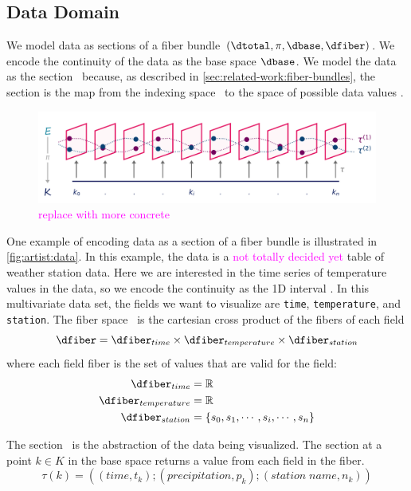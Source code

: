 \documentclass[10pt,journal,compsoc]{IEEEtran}
\newcommand{\note}[1]{\textcolor{magenta}{#1}}
\theoremstyle{definition}
\theoremstyle{remark}
\begin{document}
\subsection{Data Domain}
We model data as sections of a fiber bundle $(\dtotal, \pi, \dbase, \dfiber)$. We encode the continuity of the data as the \textcolor{base}{base space} $\dbase$. We model the data as the section \dsection\ because, as described in \autoref{sec:related-work:fiber-bundles}, the section is the map from the indexing space \dbase\ to the space of possible data values \dfiber. 

\begin{figure}[h!]
  \includegraphics[width=\columnwidth]{fiberbundle.png}
  \caption{\note{replace with more concrete}}
  \label{fig:artist:data}
\end{figure}

One example of encoding data as a section of a fiber bundle is illustrated in \autoref{fig:artist:data}. In this example, the data is a \note{not totally decided yet} table of weather station data. Here we are interested in the time series of temperature values in the data, so we encode the continuity as the 1D interval \dbase. In this multivariate data set, the fields we want to visualize are \texttt{time}, \texttt{temperature}, and \texttt{station}. The fiber space \dfiber\ is the cartesian cross product of the fibers of each field
\begin{equation*}
  \dfiber = \dfiber_{time} \times \dfiber_{temperature} \times \dfiber_{station}
\end{equation*}
where each field fiber is the set of values that are valid for the field: 
\begin{align*}
  \dfiber_{time} &= \mathbb{R} \\
  \dfiber_{temperature} &= \mathbb{R}\\
  \dfiber_{station} &= \{s_0, s_1, \cdots, s_i, \cdots, s_n\} 
\end{align*}

The section \dsection\ is the abstraction of the data being visualized. The section at a point $k \in K$ in the base space returns a value from each field in the fiber.
\begin{equation*}
  \tau(k) = ((time, t_k); (precipitation, p_k); (station\;name, n_k))
\end{equation*}
\end{document}
